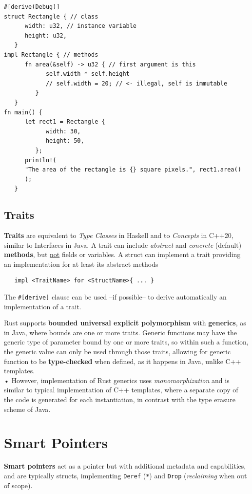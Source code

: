 \begin{lstlisting}
#[derive(Debug)]
struct Rectangle { // class
      width: u32, // instance variable
      height: u32,
   }
impl Rectangle { // methods
      fn area(&self) -> u32 { // first argument is this
            self.width * self.height
            // self.width = 20; // <- illegal, self is immutable
         }
   }
fn main() {
      let rect1 = Rectangle {
            width: 30,
            height: 50,
         };
      println!(
      "The area of the rectangle is {} square pixels.", rect1.area()
      );
   }
\end{lstlisting}

\subsection{Traits}
\textbf{Traits} are equivalent to \textit{Type Classes} in Haskell and to \textit{Concepts} in
C++20, similar to Interfaces in Java.
A trait can include \textit{abstract} and \textit{concrete} (default)
\textbf{methods}, but \underline{not} fields or variables.
A struct can implement a trait providing an
implementation for at least its abstract methods
\begin{lstlisting}
   impl <TraitName> for <StructName>{ ... }
\end{lstlisting}

The \lstinline|#[derive]| clause can be used {--}if possible{--} to derive
automatically an implementation of a trait.
\nl

Rust supports \textbf{bounded universal explicit polymorphism}
with \textbf{generics}, as in Java, where bounds are one or
more traits. 
Generic functions may have the generic type of parameter
bound by one or more traits, so within such a function, the
generic value can only be used through those traits,
allowing for generic function to be \textbf{type-checked} when
defined, as it happens in Java, unlike C++ templates.\\
• However, implementation of Rust generics uses \textit{monomorphization} and is similar to
typical implementation of C++ templates, where a separate copy
of the code is generated for each instantiation, in contrast with the
type erasure scheme of Java.

\section{Smart Pointers}
\textbf{Smart pointers} act as a pointer but with additional metadata and capabilities, and are typically structs, implementing \texttt{Deref} (\lstinline|*|) and
\texttt{Drop} (\textit{reclaiming} when out of scope).

